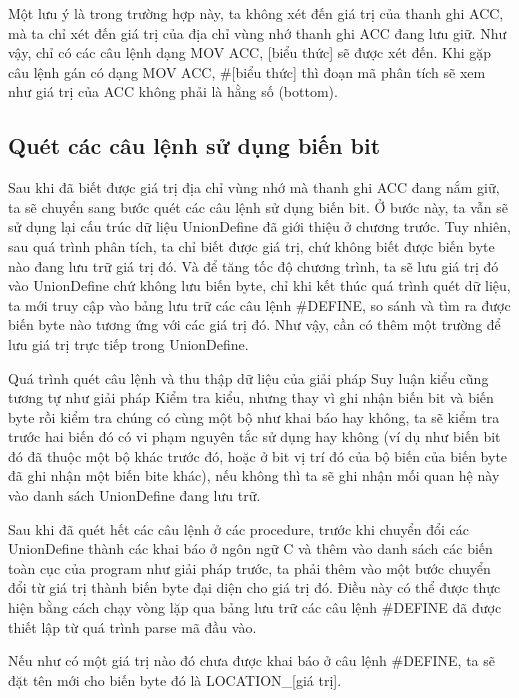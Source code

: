 Một lưu ý là trong trường hợp này, ta không xét đến giá trị của thanh ghi ACC, mà ta chỉ xét đến giá trị của địa chỉ vùng nhớ thanh ghi ACC đang lưu giữ. Như vậy, chỉ có các câu lệnh dạng MOV ACC, [biểu thức] sẽ được xét đến. Khi gặp câu lệnh gán có dạng MOV ACC, \#[biểu thức] thì đoạn mã phân tích sẽ xem như giá trị của ACC không phải là hằng số (bottom).
\subsection{Quét các câu lệnh sử dụng biến bit}

Sau khi đã biết được giá trị địa chỉ vùng nhớ mà thanh ghi ACC đang nắm giữ, ta sẽ chuyển sang bước quét các câu lệnh sử dụng biến bit. Ở bước này, ta vẫn sẽ sử dụng lại cấu trúc dữ liệu UnionDefine đã giới thiệu ở chương trước. Tuy nhiên, sau quá trình phân tích, ta chỉ biết được giá trị, chứ không biết được biến byte nào đang lưu trữ giá trị đó. Và để tăng tốc độ chương trình, ta sẽ lưu giá trị đó vào UnionDefine chứ không lưu biến byte, chỉ khi kết thúc quá trình quét dữ liệu, ta mới truy cập vào bảng lưu trữ các câu lệnh \#DEFINE, so sánh và tìm ra được biến byte nào tương ứng với các giá trị đó. Như vậy, cần có thêm một trường để lưu giá trị trực tiếp trong UnionDefine.


Quá trình quét câu lệnh và thu thập dữ liệu của giải pháp Suy luận kiểu cũng tương tự như giải pháp Kiểm tra kiểu, nhưng thay vì ghi nhận biến bit và biến byte rồi kiểm tra chúng có cùng một bộ như khai báo hay không, ta sẽ kiểm tra trước hai biến đó có vi phạm nguyên tắc sử dụng hay không (ví dụ như biến bit đó đã thuộc một bộ khác trước đó, hoặc ở bit vị trí đó của bộ biến của biến byte đã ghi nhận một biến bite khác), nếu không thì ta sẽ ghi nhận mối quan hệ này vào danh sách UnionDefine đang lưu trữ.


Sau khi đã quét hết các câu lệnh ở các procedure, trước khi chuyển đổi các UnionDefine thành các khai báo ở ngôn ngữ C và thêm vào danh sách các biến toàn cục của program như giải pháp trước, ta phải thêm vào một bước chuyển đổi từ giá trị thành biến byte đại diện cho giá trị đó. Điều này có thể được thực hiện bằng cách chạy vòng lặp qua bảng lưu trữ các câu lệnh \#DEFINE đã được thiết lập từ quá trình parse mã đầu vào.


Nếu như có một giá trị nào đó chưa được khai báo ở câu lệnh \#DEFINE, ta sẽ đặt tên mới cho biến byte đó là LOCATION\_[giá trị].

